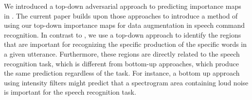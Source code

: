 \documentclass{article}
\begin{document}
We introduced a top-down adversarial approach to predicting importance maps in \cite{trinh2018bubble,kavaki20_interspeech}. The current paper builds upon those approaches to introduce a method of using our top-down importance maps for data augmentation in speech command recognition. In contrast to \cite{do2018weighting}, we use a top-down approach to identify the regions that are important for recognizing the specific production of the specific words in a given utterance. Furthermore, these regions are directly related to the speech recognition task, which is different from bottom-up approaches, which produce the same prediction regardless of the task. For instance, a bottom up approach using intensity filters might predict that a spectrogram area containing loud noise is important for the speech recognition task. 
\end{document}
